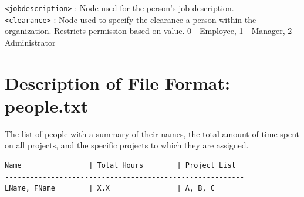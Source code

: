 \documentclass[12pt]{article}
\begin{document}
\texttt{<jobdescription>} : Node used for the person's job description. \\

\texttt{<clearance>} : Node used to specify the clearance a person within the organization.
Restricts permission based on value. 0 - Employee, 1 - Manager, 2 - Administrator \\

\section{Description of File Format: people.txt}

The list of people with a summary of their names, the total amount of time
spent on all projects, and the specific projects to which they are assigned.

\begin{lstlisting}
Name                | Total Hours        | Project List              
---------------------------------------------------------
LName, FName        | X.X                | A, B, C
\end{lstlisting}
\end{document}
